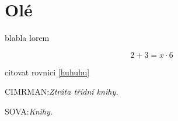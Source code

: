 \documentclass[a4paper]{article}
\numberwithin{equation}{section}
\begin{document}
\section{Olé}


blabla lorem \cite{cimr}


\begin{equation}
\label{huhuhu}
    2+3=x\cdot 6
\end{equation}

citovat rovnici \ref{huhuhu}


\begin{thebibliography}{9}
 CIMRMAN:\textit{Ztráta třídní knihy.}

 SOVA:\textit{Knihy.}

\end{thebibliography}
\end{document}
